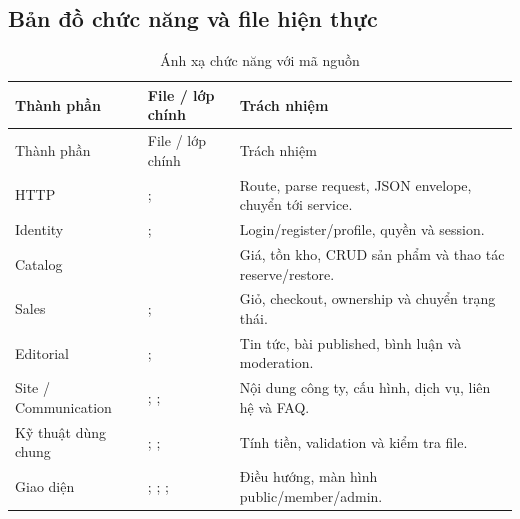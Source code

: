 \subsection{Bản đồ chức năng và file hiện thực}
\begin{longtable}{@{}P{3cm}P{6.6cm}P{4.9cm}@{}}
\caption{Ánh xạ chức năng với mã nguồn}\label{tab:source-map}\\
\toprule Thành phần & File / lớp chính & Trách nhiệm\\\midrule\endfirsthead
\toprule Thành phần & File / lớp chính & Trách nhiệm\\\midrule\endhead
HTTP & ;  & Route, parse request, JSON envelope, chuyển tới service.\\
Identity & ;  & Login/register/profile, quyền và session.\\
Catalog &  & Giá, tồn kho, CRUD sản phẩm và thao tác reserve/restore.\\
Sales & ;  & Giỏ, checkout, ownership và chuyển trạng thái.\\
Editorial & ;  & Tin tức, bài published, bình luận và moderation.\\
Site / Communication & ; ;  & Nội dung công ty, cấu hình, dịch vụ, liên hệ và FAQ.\\
Kỹ thuật dùng chung & ; ;  & Tính tiền, validation và kiểm tra file.\\
Giao diện & ; ; ;  & Điều hướng, màn hình public/member/admin.\\
\bottomrule\end{longtable}

